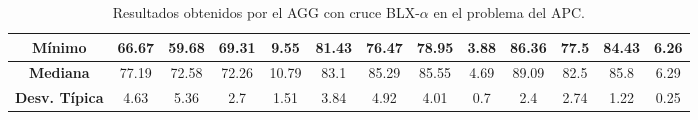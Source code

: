 \documentclass[11pt,a4paper]{article}
\begin{document}
\begin{table}[H]
{\begin{tabular}{c|c|c|c|c|c|c|c|c|c|c|c|c|}
\multicolumn{1}{|c|}{\textbf{Mínimo}}       & 66.67             & 59.68                   & 69.31         & 9.55       & 81.43             & 76.47          & 78.95         & 3.88       & 86.36             & 77.5           & 84.43         & 6.26       \\ \hline
\multicolumn{1}{|c|}{\textbf{Mediana}}      & 77.19             & 72.58                   & 72.26         & 10.79      & 83.1              & 85.29          & 85.55         & 4.69       & 89.09             & 82.5           & 85.8          & 6.29       \\ \hline
\multicolumn{1}{|c|}{\textbf{Desv. Típica}} & 4.63              & 5.36                    & 2.7           & 1.51       & 3.84              & 4.92           & 4.01          & 0.7        & 2.4               & 2.74           & 1.22          & 0.25       \\ \hline
\end{tabular}
}%
\caption{Resultados obtenidos por el AGG con cruce BLX-$\alpha$ en el problema del APC.}
\end{table}
\end{document}
